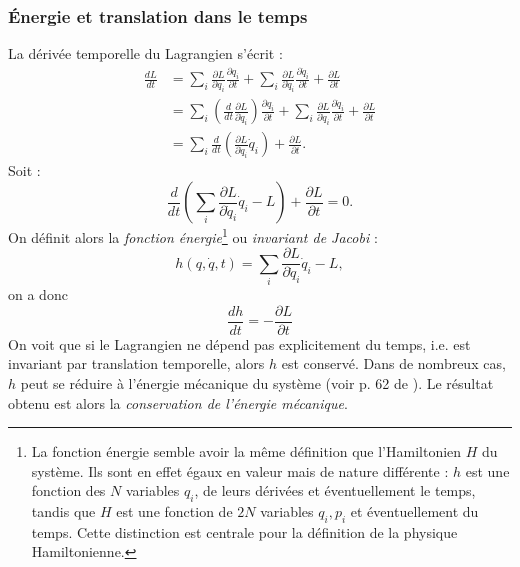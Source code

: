 \subsubsection{\'{E}nergie et translation dans le temps}
La dérivée temporelle du Lagrangien s'écrit : 
\begin{align*}
\frac{dL}{dt}&=\sum_i\frac{\partial L}{\partial q_i}\frac{\partial q_i}{\partial t}+\sum_i\frac{\partial L}{\partial \dot{q}_i}\frac{\partial \dot{q}_i}{\partial t}+\frac{\partial L}{\partial t}\\
&= \sum_i\left(\frac{d}{dt}\frac{\partial L}{\partial \dot{q}_i}\right)\frac{\partial q_i}{\partial t}+\sum_i\frac{\partial L}{\partial \dot{q}_i}\frac{\partial \dot{q}_i}{\partial t}+\frac{\partial L}{\partial t}\\
&= \sum_i\frac{d}{dt}\left(\frac{\partial L}{\partial \dot{q}_i}\dot{q}_i\right)+\frac{\partial L}{\partial t}.
\end{align*}
Soit :
\begin{equation*}
\frac{d}{dt}\left(\sum_i\frac{\partial L}{\partial \dot{q}_i}\dot{q}_i-L\right)+\frac{\partial L}{\partial t}=0.
\end{equation*}
On définit alors la \textit{fonction énergie}\footnote{La fonction énergie semble avoir la même définition que l'Hamiltonien $H$ du système. Ils sont en effet égaux en valeur mais de nature différente : $h$ est une fonction des $N$ variables ${q_i}$, de leurs dérivées et éventuellement le temps, tandis que $H$ est une fonction de $2N$ variables ${q_i,p_i}$ et éventuellement du temps. Cette distinction est centrale pour la définition de la physique Hamiltonienne.} ou \textit{invariant de Jacobi} :
\begin{equation*}
h(q,\dot{q},t) = \sum_i\frac{\partial L}{\partial \dot{q}_i}\dot{q}_i-L,
\end{equation*}
on a donc 
\begin{equation*}
\frac{dh}{dt} = -\frac{\partial L}{\partial t}
\end{equation*}
On voit que si le Lagrangien ne dépend pas explicitement du temps, i.e. est invariant par translation temporelle, alors $h$ est conservé. Dans de nombreux cas, $h$ peut se réduire à l'énergie mécanique du système (voir p. 62 de ). Le résultat obtenu est alors la \textit{conservation de l'énergie mécanique}. 


